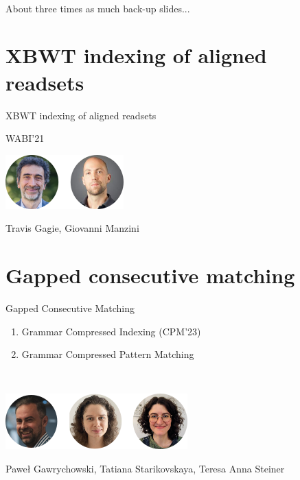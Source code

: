 \appendix
\backupbegin

\begin{frame}
  \centering
  \\
  \bigskip
  {\large About three times as much back-up slides...}
\end{frame}

%



%

\section{XBWT indexing of aligned readsets}
\begin{frame}
  \centering
  {\Large XBWT indexing of aligned readsets}
    
  \medskip
  {\large WABI'21}
  \bigskip
  
  \includegraphics{pictures/mindmap/xbwt.png}
  
  \bigskip
  Travis Gagie, Giovanni Manzini
\end{frame}

%

\section{Gapped consecutive matching}

\begin{frame}
  \centering
  {\Large Gapped Consecutive Matching}

  \bigskip
  \begin{minipage}{0.55\textwidth}  
    \begin{enumerate}
      \item Grammar Compressed Indexing (CPM'23)
      \item Grammar Compressed Pattern Matching
    \end{enumerate}
  \end{minipage}\\
  \bigskip
  
  \includegraphics{pictures/mindmap/gapped.png}

  \bigskip
  Paweł Gawrychowski, Tatiana Starikovskaya, Teresa Anna Steiner
\end{frame}


%
\backupend

